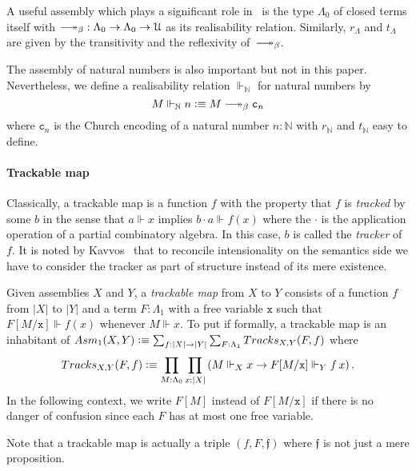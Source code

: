 \documentclass[a4paper,UKenglish,numberwithinsect,cleveref,thm-restate]{lipics-v2021}
\newcommand{\Nat}{\mathbb{N}}
\newcommand{\Asm}{\mathsf{Asm}}
\newcommand{\defeq}{\vcentcolon\equiv}
\newcommand{\Univ}{\mathcal{U}}
\DeclareRobustCommand\longtwoheadrightarrow{\relbar\joinrel\twoheadrightarrow}
\newcommand{\reduce}{\longtwoheadrightarrow_{\beta}}
\theoremstyle{plain}
\begin{document}
\begin{example}
  A useful assembly which plays a significant role in~ is the type $\Lambda_0$ of closed terms itself with ${\reduce} : \Lambda_0 \to \Lambda_0 \to \Univ$ as its realisability relation.
  Similarly, $r_\Lambda$ and $t_\Lambda$ are given by the transitivity and the reflexivity of~$\reduce$.
  
\end{example}

\begin{example}
  The assembly of natural numbers is also important but not in this paper.
  Nevertheless, we define a realisability relation $\Vdash_{\Nat}$ for natural numbers by
  \[
    M \Vdash_\Nat n \defeq M \reduce \mathtt{c}_n
  \]
  where $\mathtt{c}_n$ is the Church encoding of a natural number $n : \Nat$ with $r_\Nat$ and $t_\Nat$ easy to define. 
\end{example}

\paragraph*{Trackable map}%
Classically, a trackable map is a function $f$ with the property that $f$ is \emph{tracked} by some $b$ in the sense that $a \Vdash x$ implies $b \cdot a \Vdash f(x)$ where the $\cdot$ is the application operation of a partial combinatory algebra. In this case, $b$ is called the \emph{tracker} of $f$.
It is noted by Kavvos~\cite{Kavvos2017b} that to reconcile intensionality on the semantics side we have to consider the tracker as part of structure instead of its mere existence.
\begin{definition}\label{def:trackable}
  Given assemblies $X$ and $Y$, a \emph{trackable map} from $X$ to $Y$ consists of a function $f$ from $|X|$ to $|Y|$ and a term $F : \Lambda_1$ with a free variable $\mathtt{x}$ such that $F[M/\mathtt{x}] \Vdash f(x)$ whenever $M \Vdash x$.
  To put if formally, a trackable map is an inhabitant of $\Asm_1(X, Y) \defeq \sum_{f : |X| \to |Y|} \sum_{F : \Lambda_1} \mathsf{Tracks}_{X, Y}(F, f)$ where
  \[
    \mathsf{Tracks}_{X, Y}(F, f) \defeq \prod_{M : \Lambda_0} \prod_{x : |X|}
    \left( M \Vdash_X x \to F[M/\mathtt{x}] \Vdash_Y f\, x \right).
  \]
  In the following context, we write $F[M]$ instead of $F[M/\mathtt{x}]$ if there is no danger of confusion since each $F$ has at most one free variable.
\end{definition}
Note that a trackable map is actually a triple $(f, F, \mathfrak{f})$ where $\mathfrak{f}$ is not just a mere proposition.
\end{document}
